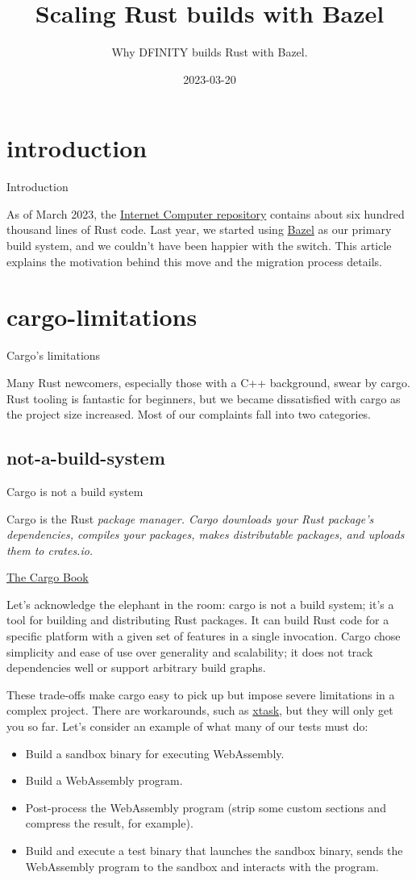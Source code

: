 \documentclass{article}
\title{Scaling Rust builds with Bazel}
\subtitle{Why DFINITY builds Rust with Bazel.}
\date{2023-03-20}
\begin{document}
\section{introduction}{Introduction}

As of March 2023, the \href{https://github.com/dfinity/ic}{Internet Computer repository} contains about six hundred thousand lines of Rust code.
Last year, we started using \href{https://bazel.build/}{Bazel} as our primary build system, and we couldn't have been happier with the switch.
This article explains the motivation behind this move and the migration process details.

\section{cargo-limitations}{Cargo's limitations}

Many Rust newcomers, especially those with a C++ background, swear by cargo.
Rust tooling is fantastic for beginners, but we became dissatisfied with cargo as the project size increased.
Most of our complaints fall into two categories.

\subsection{not-a-build-system}{Cargo is not a build system}
\epigraph{
    Cargo is the Rust \em{package manager}.
    Cargo downloads your Rust package's dependencies, compiles your packages, makes distributable packages, and uploads them to crates.io.
}{\href{https://doc.rust-lang.org/cargo/}{The Cargo Book}}

Let's acknowledge the elephant in the room: cargo is not a build system; it's a tool for building and distributing Rust packages.
It can build Rust code for a specific platform with a given set of features in a single invocation.
Cargo chose simplicity and ease of use over generality and scalability; it does not track dependencies well or support arbitrary build graphs.

These trade-offs make cargo easy to pick up but impose severe limitations in a complex project.
There are workarounds, such as \href{https://github.com/matklad/cargo-xtask}{xtask}, but they will only get you so far.
Let's consider an example of what many of our tests must do:

\begin{itemize}
  \item Build a sandbox binary for executing WebAssembly.
  \item Build a WebAssembly program.
  \item Post-process the WebAssembly program (strip some custom sections and compress the result, for example).
  \item Build and execute a test binary that launches the sandbox binary, sends the WebAssembly program to the sandbox and interacts with the program.
\end{itemize}
\end{document}
